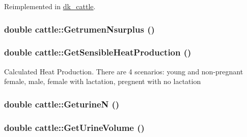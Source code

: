 Reimplemented in \hyperlink{classdk__cattle_a33782ebe3783a6ef6ff393b0803c53b4}{dk\_\-cattle}.\hypertarget{classcattle_a025d988cdff86a92ff8bb87d8f918cd5}{
\subsubsection[{GetrumenNsurplus}]{\setlength{\rightskip}{0pt plus 5cm}double cattle::GetrumenNsurplus ()}}
\label{classcattle_a025d988cdff86a92ff8bb87d8f918cd5}
\hypertarget{classcattle_a96d6a13910c586fc522ae1dbb11730d8}{
\subsubsection[{GetSensibleHeatProduction}]{\setlength{\rightskip}{0pt plus 5cm}double cattle::GetSensibleHeatProduction ()}}
\label{classcattle_a96d6a13910c586fc522ae1dbb11730d8}
Calculated Heat Production. There are 4 scenarios: young and non-\/pregnant female, male, female with lactation, pregnent with no lactation \hypertarget{classcattle_a5959426fa68c0093242785ddd0a928d2}{
\subsubsection[{GeturineN}]{\setlength{\rightskip}{0pt plus 5cm}double cattle::GeturineN ()}}
\label{classcattle_a5959426fa68c0093242785ddd0a928d2}
\hypertarget{classcattle_add87f09e9b8ef0ed3ca7dcf9e4ac7172}{
\subsubsection[{GetUrineVolume}]{\setlength{\rightskip}{0pt plus 5cm}double cattle::GetUrineVolume ()}}
\label{classcattle_add87f09e9b8ef0ed3ca7dcf9e4ac7172}
